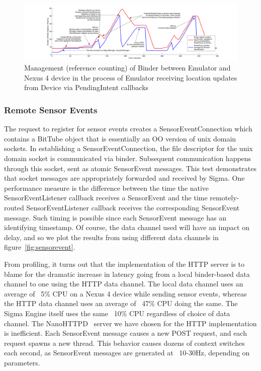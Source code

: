 \documentclass[prodmode]{acmlarge}
\begin{document}
\begin{figure}[h]
\centering
\includegraphics[width=\textwidth]{plots/location_sharing_reference_counting.pdf}
\caption{Management (reference counting) of Binder between Emulator and Nexus 4 device in the process of Emulator receiving location updates from Device via PendingIntent callbacks}
\label{fig:reference_counting}
\end{figure}

\subsubsection{Remote Sensor Events}
\label{sec:sensorevent}
The request to register for sensor events creates a SensorEventConnection which contains a BitTube object that is essentially an OO version of unix domain sockets. In establishing a SensorEventConnection, the file descriptor for the unix domain socket is communicated via binder. Subsequent communication happens through this socket, sent as atomic SensorEvent messages. This test demonstrates that socket messages are appropriately forwarded and received by Sigma. One performance measure is the difference between the time the native SensorEventListener callback receives a SensorEvent and the time remotely-routed SensorEventListener callback receives the corresponding SensorEvent message. Such timing is possible since each SensorEvent message has an identifying timestamp. Of course, the data channel used will have an impact on delay, and so we plot the results from using different data channels in figure~\ref{fig:sensorevent}.

From profiling, it turns out that the implementation of the HTTP server is to blame for the dramatic increase in latency going from a local binder-based data channel to one using the HTTP data channel. The local data channel uses an average of ~5\% CPU on a Nexus 4 device while sending sensor events, whereas the HTTP data channel uses an average of ~47\% CPU doing the same. The Sigma Engine itself uses the same ~10\% CPU regardless of choice of data channel. The NanoHTTPD~\cite{NanoHttpd} server we have chosen for the HTTP implementation is inefficient. Each SensorEvent message causes a new POST request, and each request spawns a new thread. This behavior causes dozens of context switches each second, as SensorEvent messages are generated at ~10-30Hz, depending on parameters.
\end{document}
